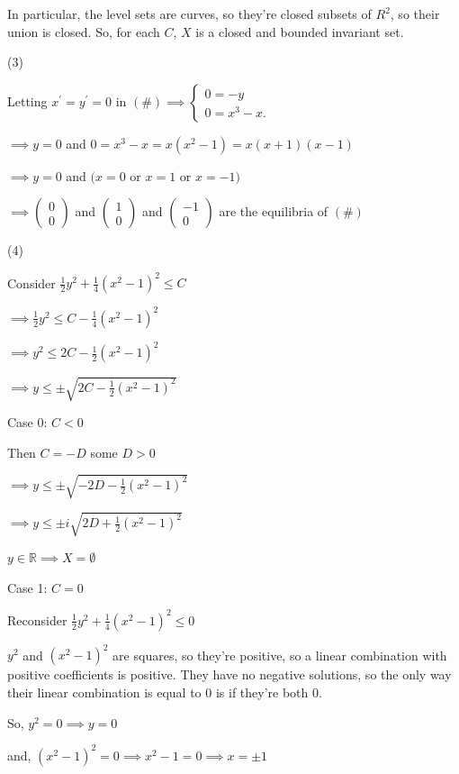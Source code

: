 \documentclass{article}
\begin{document}
In particular, the level sets are curves, so they're closed subsets
of $R^2$, so their union is closed. So, for each $C$, $X$ is a closed and bounded invariant set.

(3)

Letting $x^\prime = y^\prime = 0$ in $(\#)
\implies
\begin{cases}
0= −y\\
0= x^3 − x.
\end{cases}
$

$\implies y = 0$ and $0 = x^3 − x = x(x^2-1) = x(x+1)(x-1) $

$\implies y = 0$ and $(x =0 $ or $ x = 1$ or $x = -1 )$

$\implies \begin{pmatrix}0\\0\end{pmatrix}$ and $\begin{pmatrix}1\\
  0\end{pmatrix}$ and $\begin{pmatrix}-1 \\ 0\end{pmatrix}$ are the
equilibria of $(\#)$


(4)

Consider $\frac{1}{2}y^2 +\frac{1}{4}(x^2 -1)^2 \leq C$

$\implies \frac{1}{2}y^2 \leq C - \frac{1}{4}(x^2 -1)^2$

$\implies y^2 \leq 2C - \frac{1}{2}(x^2 -1)^2 $

$\implies y \leq \pm \sqrt{2C - \frac{1}{2}(x^2 -1)^2}$

Case 0: $C < 0$

Then $C = -D$ some $D > 0$

$\implies y \leq \pm \sqrt{-2D - \frac{1}{2}(x^2 -1)^2}$

$\implies y \leq \pm i\sqrt{2D  +\frac{1}{2}(x^2 -1)^2}$

$y\in \mathbb{R} \implies X = \emptyset$

Case 1: $C = 0$

Reconsider $\frac{1}{2}y^2 +\frac{1}{4}(x^2 -1)^2 \leq 0$

$y^2$ and $(x^2 -1)^2$ are squares, so they're
positive, so a linear combination with positive coefficients is positive. They have no negative
solutions, so the only way their linear combination is equal to $0$ is if they're
both $0$.

So, $y^2 = 0 \implies y=0$

and, $(x^2 -1)^2 = 0 \implies x^2 -1 = 0 \implies x= \pm 1$
\end{document}
